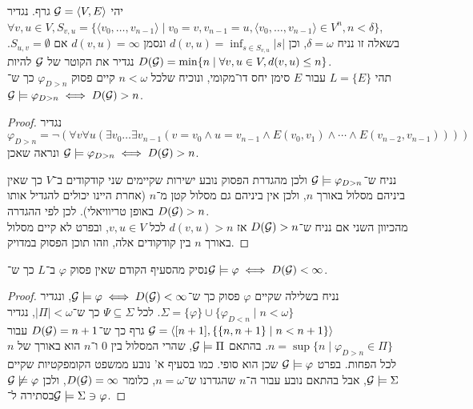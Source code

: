 \subquestion{}
יהי $\mathcal{G} = \langle V, E \rangle$ גרף.
נגדיר $\forall v, u \in V, S_{v, u} = \{ \langle v_0, \dots, v_{n - 1} \rangle \mid v_0 = v, v_{n - 1} = u, \langle v_0, \dots, v_{n - 1} \rangle \in V^n, n < \delta \}$, \\
בשאלה זו נניח $\delta = \omega$, וכן $d(v, u) = \inf_{s \in S_{v, u}} |s|$ ונסמן $d(v, u) = \infty$ אם $S_{u, v} = \emptyset$.
נגדיר את הקוטר של $\mathcal{G}$ להיות $D(\mathcal{G}) = \min \{ n \mid \forall v, u \in V, d(v, u) \le n \}$. \\
תהי $L = \{ E \}$ עבור $E$ סימן יחס דו־מקומי, ונוכיח שלכל $n < \omega$ קיים פסוק $\varphi_{D > n}$ כך ש־$\mathcal{G} \models \varphi_{D > n} \iff D(\mathcal{G}) > n$.
\begin{proof}
	נגדיר
	\[
		\varphi_{D > n}
		= \lnot (\forall v \forall u (\exists v_0 \dots \exists v_{n - 1} (v = v_0 \land u = v_{n - 1} \land E(v_0, v_1) \land \cdots \land E(v_{n - 2}, v_{n - 1}))))
	\]
	ונראה שאכן $\mathcal{G} \models \varphi_{D > n} \iff D(\mathcal{G}) > n$.

	נניח ש־$\mathcal{G} \models \varphi_{D > n}$ ולכן מהגדרת הפסוק נובע ישירות שקיימים שני קודקודים ב־$V$ כך שאין ביניהם מסלול באורך $n$, ולכן אין ביניהם גם מסלול קטן מ־$n$ (אחרת היינו יכולים להגדיל אותו באופן טריוויאלי).
	לכן לפי ההגדרה $D(\mathcal{G}) > n$. \\
	מהכיוון השני אם נניח ש־$D(\mathcal{G}) > n$ אז $d(v, u) > n$ לכל $v, u \in V$, ובפרט לא קיים מסלול באורך $n$ בין קודקודים אלה, וזהו תוכן הפסוק במדויק.
\end{proof}

\subquestion{}
נסיק מהסעיף הקודם שאין פסוק $\varphi$ ב־$L$ כך ש־$\mathcal{G} \models \varphi \iff D(\mathcal{G}) < \infty$.
\begin{proof}
	נניח בשלילה שקיים $\varphi$ פסוק כך ש־$\mathcal{G} \models \varphi \iff D(\mathcal{G}) < \infty$, ונגדיר $\Sigma = \{ \varphi \} \cup \{ \varphi_{D < n} \mid n < \omega \}$.
	לכל $\Psi \subseteq \Sigma$ כך ש־$|\Pi| < \omega$, נגדיר $\mathcal{G} = \langle [n + 1], \{ \{n, n + 1\} \mid n < n + 1 \} \rangle$ גרף כך ש־$D(\mathcal{G}) = n + 1$ עבור $n = \sup \{ n \mid \varphi_{D > n} \in \Pi \}$.
	בהתאם $\mathcal{G} \models \Pi$, שהרי המסלול בין $0$ ו־$n$ הוא באורך של $n$ לכל הפחות. בפרט $\mathcal{G} \models \varphi$ שכן הוא סופי.
	כמו בסעיף א' נובע ממשפט הקומפקטיות שקיים $\mathcal{G} \models \Sigma$, אבל בהתאם נובע עבור ה־$n$ שהגדרנו ש־$n = \omega$, כלומר $D(\mathcal{G}) = \infty$, ולכן $\mathcal{G} \not\models \varphi$ בסתירה ל־$\mathcal{G} \models \Sigma \ni \varphi$.
\end{proof}

